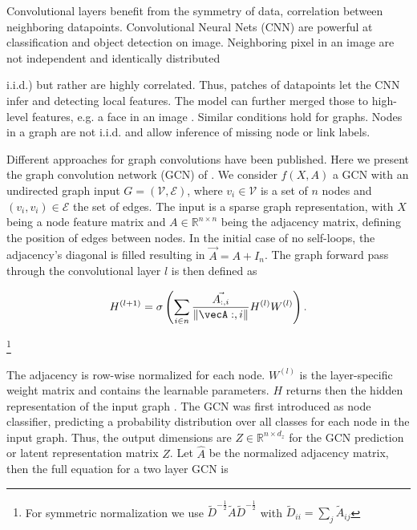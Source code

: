 Convolutional layers benefit from the symmetry of data, correlation between neighboring datapoints. Convolutional Neural Nets (CNN) are powerful at classification and object detection on image. Neighboring pixel in an image are not independent and identically distributed {i.i.d.) but rather are highly correlated. Thus, patches of datapoints let the CNN infer and detecting local features. The model can further merged those to high-level features, e.g. a face in an image \cite{bishop_pattern_2006}. Similar conditions hold for graphs. Nodes in a graph are not i.i.d. and allow inference of missing node or link labels. 

Different approaches for graph convolutions have been published. Here we present the graph convolution network (GCN) of \cite{kipf_semi-supervised_2017}.
We consider $f(X,A)$ a GCN with an undirected graph input ${G}=(\mathcal{V}, \mathcal{E})$, where $v_{i} \in \mathcal{V}$ is a set of $n$ nodes and  $\left(v_{i}, v_{i}\right) \in \mathcal{E}$ the set of edges. The input is a sparse graph representation, with $X$ being a node feature matrix and $A \in \mathbb{R}^{n \times n}$ being the adjacency matrix, defining the position of edges between nodes. In the initial case of no self-loops, the adjacency's diagonal is filled resulting in $\vec{A}=A+I_{n}$. The graph forward pass through the convolutional layer $l$ is then defined as

\begin{equation}
    H^{(l+1)}=\sigma\left(\sum_{i \in n} \frac{\vec{A_{:,i}}}{\|\vecA:,i\|} H^{(l)} W^{(l)}\right).
\end{equation}


\footnote{For symmetric normalization we use $\tilde{D}^{-\frac{1}{2}} \tilde{A} \tilde{D}^{-\frac{1}{2}}$ with $\tilde{D}_{i i}=\sum_{j} \tilde{A}_{i j}$}

The adjacency is row-wise normalized for each node. $W^{(l)}$ is the layer-specific weight matrix and contains the learnable parameters. $H$ returns then the hidden representation of the input graph \cite{gangemi_modeling_2018}.
The GCN was first introduced as node classifier, predicting a probability distribution over all classes for each node in the input graph. Thus, the output dimensions are $Z \in \mathbb{R}^{n \times d_z}$ for the GCN prediction or latent representation matrix $Z$. Let $\hat{A}$ be the normalized adjacency matrix, then the full equation for a two layer GCN is 

}
